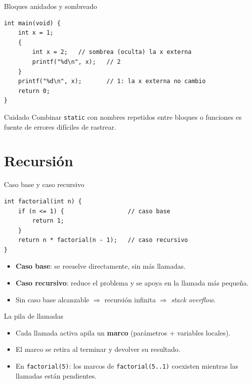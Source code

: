 \documentclass[11pt]{beamer}
\begin{document}
\begin{frame}[fragile]{Bloques anidados y sombreado}
\begin{lstlisting}
int main(void) {
    int x = 1;
    {
        int x = 2;   // sombrea (oculta) la x externa
        printf("%d\n", x);   // 2
    }
    printf("%d\n", x);       // 1: la x externa no cambio
    return 0;
}
\end{lstlisting}
  \begin{alertblock}{Cuidado}
    Combinar \texttt{static} con nombres repetidos entre bloques o funciones es fuente de errores
    difíciles de rastrear.
  \end{alertblock}
\end{frame}

\section{Recursión}

\begin{frame}[fragile]{Caso base y caso recursivo}
\begin{lstlisting}
int factorial(int n) {
    if (n <= 1) {                  // caso base
        return 1;
    }
    return n * factorial(n - 1);   // caso recursivo
}
\end{lstlisting}
  \begin{itemize}
    \item \textbf{Caso base}: se resuelve directamente, sin más llamadas.
    \item \textbf{Caso recursivo}: reduce el problema y se apoya en la llamada más pequeña.
    \item Sin caso base alcanzable $\Rightarrow$ recursión infinita $\Rightarrow$
          \emph{stack overflow}.
  \end{itemize}
\end{frame}

\begin{frame}{La pila de llamadas}
  \begin{itemize}
    \item Cada llamada activa apila un \textbf{marco} (parámetros + variables locales).
    \item El marco se retira al terminar y devolver su resultado.
    \item En \texttt{factorial(5)}: los marcos de \texttt{factorial(5..1)} coexisten mientras las
          llamadas están pendientes.
  \end{itemize}
\end{frame}
\end{document}
